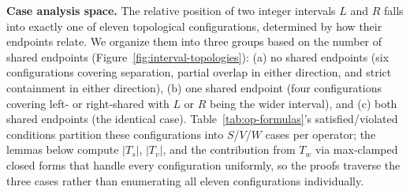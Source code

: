 \documentclass[pdflatex,sn-basic]{sn-jnl}%
\theoremstyle{thmstyleone}%
\theoremstyle{thmstyletwo}%
\theoremstyle{thmstylethree}%
\begin{document}
\smallskip
\noindent\textbf{Case analysis space.}
The relative position of two integer intervals $L$ and $R$ falls into exactly one of eleven topological configurations, determined by how their endpoints relate.
We organize them into three groups based on the number of shared endpoints (Figure~\ref{fig:interval-topologies}): (a) no shared endpoints (six configurations covering separation, partial overlap in either direction, and strict containment in either direction), (b) one shared endpoint (four configurations covering left- or right-shared with $L$ or $R$ being the wider interval), and (c) both shared endpoints (the identical case).
Table~\ref{tab:op-formulas}'s satisfied/violated conditions partition these configurations into $S$/$V$/$W$ cases per operator; the lemmas below compute $|T_s|$, $|T_v|$, and the contribution from $T_w$ via max-clamped closed forms that handle every configuration uniformly, so the proofs traverse the three cases rather than enumerating all eleven configurations individually.
\end{document}
